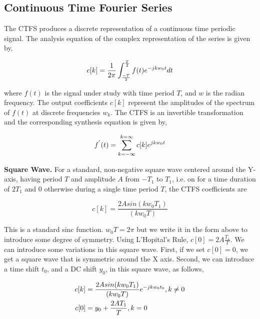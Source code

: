 \documentclass[12pt]{article}
\begin{document}
\subsection{Continuous Time Fourier Series}
The CTFS produces a discrete representation of a continuous time periodic signal.  The analysis equation of the complex representation of the series is given by,

		\begin{equation}
		c[k]=\frac{1}{2\pi} \int_{\frac{-T}{2}}^{\frac{T}{2}} f(t)e^{-jkw_0t}dt\\
		\label{eq:Fourier_Series_Analysis}
		\end{equation}
	
where $f(t)$ is the signal under study with time period $T$, and $w$ is the radian frequency.  The output coefficients $c[k]$ represent the amplitudes of the spectrum of $f(t)$ at discrete frequencies $w_k$.  The CTFS is an invertible transformation and the corresponding synthesis equation is given by,

		\begin{equation}
		f^{'}(t)= \sum_{k=-\infty}^{k=\infty} c[k]e^{jkw_{0}t}\\
		\label{eq:Fourier_Series_Synthesis}
		\end{equation}		
 						 	 	
		   				
\textbf{Square Wave.}  For a standard, non-negative square wave centered around the Y-axis, having period $T$ and amplitude $A$ from $-T_1$ to $T_1$, i.e. on for a time duration of $2T_1$ and 0 otherwise during a single time period $T$, the CTFS coefficients are

		\begin{equation}
		c[k] = \frac{2 A sin(kw_0T_1)}{(kw_0T)}
		\label{eq:Square_Wave_standard}
		\end{equation}
				
This is a standard sinc function.  $w_0T = 2\pi$ but we write it in the form above to introduce some degree of symmetry.  Using L'Hopital's Rule, $c[0]= 2A\frac{T_1}{T}$.  We can introduce some variations in this square wave.  First, if we set $c[0]=0$, we get a square wave that is symmetric around the X axis.  Second, we can introduce a time shift $t_0$, and a DC shift $y_0$, in this square wave, as follows,

		\begin{align}
		c[k] &= \frac{2 A sin(kw_0T_1)}{(kw_0T)}e^{-jkw_0t_0}, k\neq 0\notag\\
		c[0] &= y_0 + \frac{2AT_1}{T}, k=0 
		\label{eq:Square_Wave_shifted}
		\end{align}	
\end{document}
